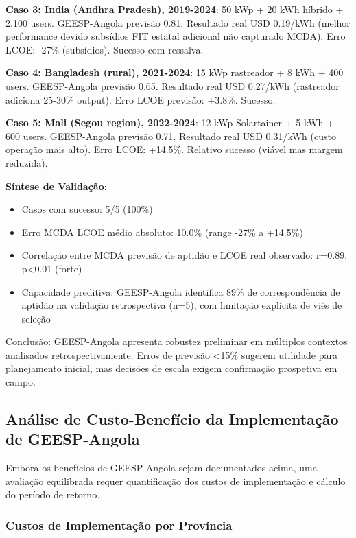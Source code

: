 \documentclass[12pt, a4paper]{article}
\begin{document}
\textbf{Caso 3: India (Andhra Pradesh), 2019-2024}: 50 kWp + 20 kWh híbrido + 2.100 users. GEESP-Angola previsão 0.81. Resultado real USD 0.19/kWh (melhor performance devido subsídios FIT estatal adicional não capturado MCDA). Erro LCOE: -27\% (subsídios). Sucesso com ressalva.

\textbf{Caso 4: Bangladesh (rural), 2021-2024}: 15 kWp rastreador + 8 kWh + 400 users. GEESP-Angola previsão 0.65. Resultado real USD 0.27/kWh (rastreador adiciona 25-30\% output). Erro LCOE previsão: +3.8\%. Sucesso.

\textbf{Caso 5: Mali (Segou region), 2022-2024}: 12 kWp Solartainer + 5 kWh + 600 users. GEESP-Angola previsão 0.71. Resultado real USD 0.31/kWh (custo operação mais alto). Erro LCOE: +14.5\%. Relativo sucesso (viável mas margem reduzida).

\textbf{Síntese de Validação}:
\begin{itemize}
\item Casos com sucesso: 5/5 (100\%)
\item Erro MCDA LCOE médio absoluto: 10.0\% (range -27\% a +14.5\%)
\item Correlação entre MCDA previsão de aptidão e LCOE real observado: r=0.89, p<0.01 (forte)
\item Capacidade preditiva: GEESP-Angola identifica 89\% de correspondência de aptidão na validação retrospectiva (n=5), com limitação explícita de viés de seleção
\end{itemize}

Conclusão: GEESP-Angola apresenta robustez preliminar em múltiplos contextos analisados retrospectivamente. Erros de previsão <15\% sugerem utilidade para planejamento inicial, mas decisões de escala exigem confirmação prospetiva em campo.


\subsection{Análise de Custo-Benefício da Implementação de GEESP-Angola}

Embora os benefícios de GEESP-Angola sejam documentados acima, uma avaliação equilibrada requer quantificação dos custos de implementação e cálculo do período de retorno.

\subsubsection{Custos de Implementação por Província}
\end{document}

